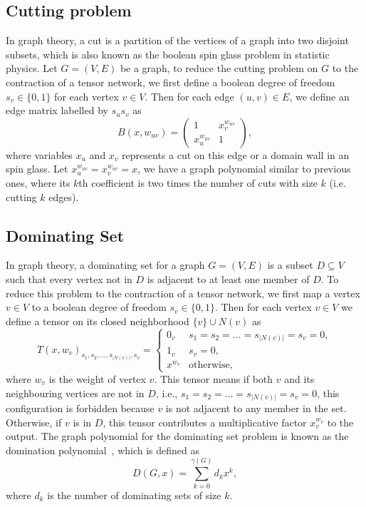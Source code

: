\documentclass[onefignum, onetabnum]{siamart190516}
\newcommand{\<}{\langle}
\renewcommand{\>}{\rangle}
\begin{document}
\subsection{Cutting problem}
In graph theory, a cut is a partition of the vertices of a graph into two disjoint subsets,
which is also known as the boolean spin glass problem in statistic physics.
Let $G=(V,E)$ be a graph, to reduce the cutting problem on $G$ to the contraction of a tensor network, we first define a boolean degree of freedom $s_v\in\{0, 1\}$ for each vertex $v\in V$.
Then for each edge $(u,v)\in E$, we define an edge matrix labelled by $s_us_v$ as
\begin{equation}
    B(x, w_{uv}) = \left(\begin{matrix}
        1 & x_{v}^{w_{uv}}\\
        x_{u}^{w_{uv}} & 1
    \end{matrix}\right),
\end{equation}
where variables $x_u$ and $x_v$ represents a cut on this edge or a domain wall in an spin glass.
Let $x_u^{w_{uv}} = x_v^{w_{uv}} = x$, we have a graph polynomial similar to previous ones,
where its $k$th coefficient is two times the number of cuts with size $k$ (i.e. cutting $k$ edges).

\subsection{Dominating Set}
In graph theory, a dominating set for a graph $G = (V, E)$ is a subset $D \subseteq V$ such that every vertex not in $D$ is adjacent to at least one member of $D$.
To reduce this problem to the contraction of a tensor network, we first map a vertex $v\in V$ to a boolean degree of freedom $s_v\in\{0, 1\}$.
Then for each vertex $v\in V$ we define a tensor on its closed neighborhood $\{v\} \cup N(v)$ as
\begin{equation}
T(x, w_v)_{s_1,s_2,\ldots,s_{|N(v)|},s_v} = \begin{cases}
    0_v & s_1=s_2=\ldots=s_{|N(v)|}=s_v=0,\\
    1_v & s_v=0,\\
    x^{w_v} & \text{otherwise},
\end{cases}
\end{equation}
where $w_v$ is the weight of vertex $v$.
This tensor means if both $v$ and its neighbouring vertices are not in $D$, i.e., $s_1=s_2=\ldots=s_{|N(v)|}=s_v=0$,
this configuration is forbidden because $v$ is not adjacent to any member in the set.
Otherwise, if $v$ is in $D$, this tensor contributes a multiplicative factor $x_v^{w_v}$ to the output.
The graph polynomial for the dominating set problem is known as the domination polynomial~\cite{Alikhani2009},
which is defined as
\begin{equation}
D(G, x) = \sum_{k=0}^{\gamma(G)} d_k x^k,
\end{equation}
where $d_k$ is the number of dominating sets of size $k$.
\end{document}
